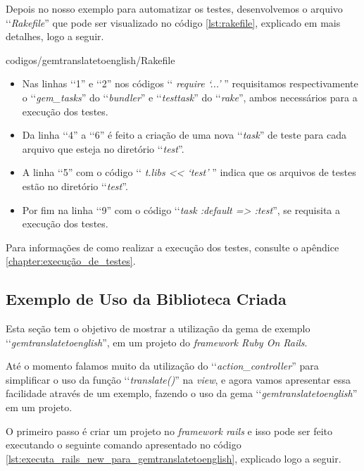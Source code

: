 Depois no nosso exemplo para automatizar os testes, desenvolvemos o arquivo ‘‘\emph{Rakefile}'' que pode
ser visualizado no código \ref{lst:rakefile}, explicado em mais detalhes, logo a seguir.


{codigos/gemtranslatetoenglish/Rakefile}

\begin{itemize}

\item Nas linhas ‘‘1'' e ‘‘2'' nos códigos ‘‘ \emph{require ‘...'} '' requisitamos respectivamente o
 ‘‘\emph{gem\_tasks}'' do ‘‘\emph{bundler}'' e ‘‘\emph{testtask}'' do ‘‘\emph{rake}'', ambos necessários para
 a execução dos testes.

 \item Da linha ‘‘4'' a ‘‘6'' é feito a criação de uma nova ‘‘\emph{task}'' de teste para cada arquivo
 que esteja no diretório ‘‘\emph{test}''.

 \item A linha ‘‘5'' com o código ‘‘ \emph{t.libs << ‘test'} '' indica que os arquivos de testes estão no
 diretório ‘‘\emph{test}''.

 \item Por fim na linha ‘‘9'' com o código ‘‘\emph{task :default => :test}'', se requisita a execução
 dos testes.

\end{itemize}

Para informações de como realizar a execução dos testes, consulte o apêndice
\ref{chapter:execução_de_testes}.


\subsection{Exemplo de Uso da Biblioteca Criada}
\label{subsection:exemplo_de_uso_da_biblioteca_criada}


Esta seção tem o objetivo de mostrar a utilização da gema de exemplo ‘‘\emph{gemtranslatetoenglish}'',
em um projeto do \emph{framework Ruby On Rails}.

Até o momento falamos muito da utilização do ‘‘\emph{action\_controller}'' para simplificar o uso da função
‘‘\emph{translate()}'' na \emph{view}, e agora vamos apresentar essa facilidade através de um exemplo,
fazendo o uso da gema ‘‘\emph{gemtranslatetoenglish}'' em um projeto.

O primeiro passo é criar um projeto no \emph{framework rails} e isso pode ser feito executando
o seguinte comando apresentado no código \ref{lst:executa_rails_new_para_gemtranslatetoenglish},
explicado logo a seguir.

